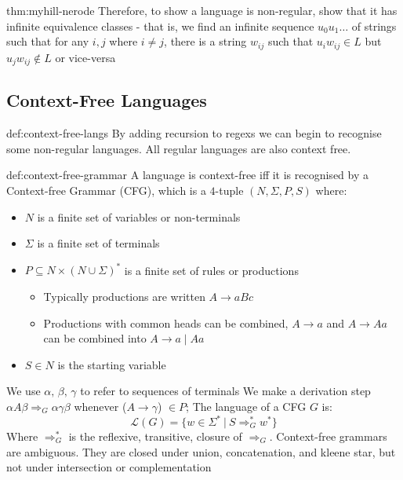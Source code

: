 \documentclass[landscape, 8pt]{extarticle}
\begin{document}
\begin{multicols}{3}
\begin{thm}{thm:myhill-nerode}{}
Therefore, to show a language is non-regular, show that it has infinite equivalence classes - that is, we find an infinite sequence $u_{0}u_{1}\dots$ of strings such that for any $i,j$ where $i\ne j$, there is a string $w_{ij}$ such that $u_{i}w_{ij}\in L$ but $u_{j}w_{ij}\not\in L$ or vice-versa
\end{thm}

\subsection*{Context-Free Languages}

\begin{dfn}{def:context-free-langs}{}
By adding recursion to regexs we can begin to recognise some non-regular languages. All regular languages are also context free. 
\end{dfn}

\newpage

\begin{dfn}{def:context-free-grammar}{}
A language is context-free iff it is recognised by a Context-free Grammar (CFG), which is a $4$-tuple $(N,\Sigma, P, S)$ where:
\renewcommand\labelitemi{\tiny$\bullet$}
\begin{itemize}
    \setlength\itemsep{0em}
    \item $N$ is a finite set of variables or non-terminals
    \item $\Sigma$ is a finite set of terminals
    \item $P\subseteq N \times (N\cup \Sigma)^{*}$ is a finite set of rules or productions
    \renewcommand\labelitemi{\tiny$\bullet$}
    \begin{itemize}
        \setlength\itemsep{0em}
        \item Typically productions are written $A\to aBc$
        \item Productions with common heads can be combined, $A\to a$ and $A\to Aa$ can be combined into $A\to a \mid Aa$
    \end{itemize}
    \item $S\in N$ is the starting variable
\end{itemize}
We use $\alpha,\,\beta,\,\gamma$ to refer to sequences of terminals\newline
We make a derivation step $\alpha A \beta \Rightarrow_G \alpha \gamma \beta$ whenever ($A \to \gamma$) $\in P$; The language of a CFG $G$ is:
\[\mathcal{L}(G)=\{w \in \Sigma^* \:|\: S \Rightarrow_G^* w^*\}\]
\newline 
Where $\Rightarrow_G^*$ is the reflexive, transitive, closure of $\Rightarrow_G$.\newline
Context-free grammars are ambiguous. They are closed under union, concatenation, and kleene star, but not under intersection or complementation
\end{dfn}


\end{multicols}
\end{document}

